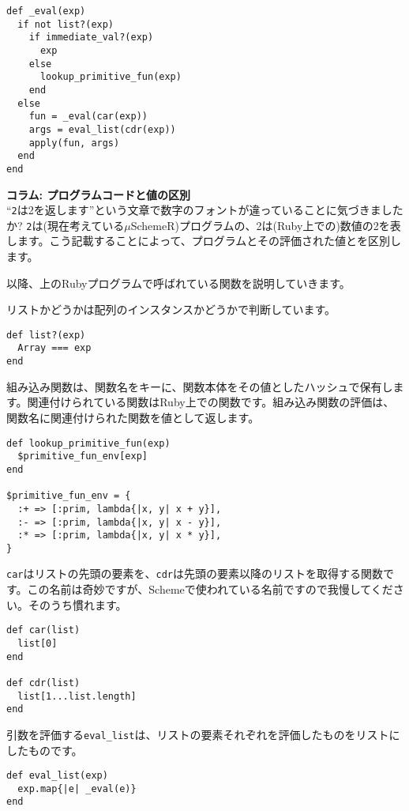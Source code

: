\begin{lstlisting}
def _eval(exp)
  if not list?(exp) 
    if immediate_val?(exp)
      exp
    else 
      lookup_primitive_fun(exp)
    end
  else
    fun = _eval(car(exp))
    args = eval_list(cdr(exp))
    apply(fun, args)
  end
end
\end{lstlisting}

\begin{boxnote}
{\bf コラム: プログラムコードと値の区別} \\

“{\tt 2}は2を返します”という文章で数字のフォントが違っていることに気づきましたか? {\tt 2}は(現在考えている$\mu$SchemeR)プログラムの、2は(Ruby上での)数値の2を表します。こう記載することによって、プログラムとその評価された値とを区別します。
\end{boxnote}

以降、上のRubyプログラムで呼ばれている関数を説明していきます。

リストかどうかは配列のインスタンスかどうかで判断しています。

\begin{lstlisting}
def list?(exp)
  Array === exp
end
\end{lstlisting}

組み込み関数は、関数名をキーに、関数本体をその値としたハッシュで保有しま
す。関連付けられている関数はRuby上での関数です。組み込み関数の評価は、
関数名に関連付けられた関数を値として返します。

\begin{lstlisting}
def lookup_primitive_fun(exp)
  $primitive_fun_env[exp]
end

$primitive_fun_env = {
  :+ => [:prim, lambda{|x, y| x + y}],
  :- => [:prim, lambda{|x, y| x - y}],
  :* => [:prim, lambda{|x, y| x * y}], 
}
\end{lstlisting}

{\tt car}はリストの先頭の要素を、{\tt cdr}は先頭の要素以降のリストを取得する関数です。この名前は奇妙ですが、Schemeで使われている名前ですので我慢してください。そのうち慣れます。

\begin{lstlisting}
def car(list)
  list[0]
end

def cdr(list)
  list[1...list.length]
end
\end{lstlisting}

引数を評価する{\tt eval\_list}は、リストの要素それぞれを評価したものをリストにしたものです。

\begin{lstlisting}
def eval_list(exp)
  exp.map{|e| _eval(e)}
end    
\end{lstlisting}

